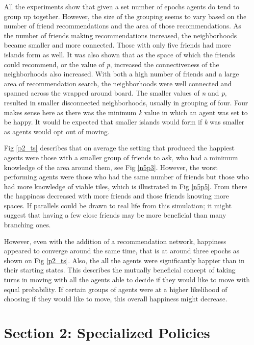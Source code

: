 \documentclass[11pt]{article}
\begin{document}
	All the experiments show that given a set number of epochs agents do tend to group up together. However, the size of the grouping seems to vary based on the number of friend recommendations and the area of those recommendations. As the number of friends making recommendations increased, the neighborhoods became smaller and more connected. Those with only five friends had more islands form as well. It was also shown that as the space of which the friends could recommend, or the value of \textit{p}, increased the connectiveness of the neighborhoods also increased. With both a high number of friends and a large area of recommendation search, the neighborhoods were well connected and spanned across the wrapped around board. The smaller values of \textit{n} and \textit{p}, resulted in smaller disconnected neighborhoods, usually in grouping of four. Four makes sense here as there was the minimum \textit{k} value in which an agent was set to be happy. It would be expected that smaller islands would form if \textit{k} was smaller as agents would opt out of moving. \par
	Fig \ref{p2_ts} describes that on average the setting that produced the happiest agents were those with a smaller group of friends to ask, who had a minimum knowledge of the area around them, see Fig \ref{n5p3}. However, the worst performing agents were those who had the same number of friends but those who had more knowledge of viable tiles, which is illustrated in Fig \ref{n5p5}. From there the happiness decreased with more friends and those friends knowing more spaces. If parallels could be drawn to real life from this simulation; it might suggest that having a few close friends may be more beneficial than many branching ones. \par
	However, even with the addition of a recommendation network, happiness appeared to converge around the same time, that is at around three epochs as shown on Fig \ref{p2_ts}. Also, the all the agents were significantly happier than in their starting states. This describes the mutually beneficial concept of taking turns in moving with all the agents able to decide if they would like to move with equal probability. If certain groups of agents were at a higher likelihood of choosing if they would like to move, this overall happiness might decrease. 
	


	\newpage
	\section{Section 2: Specialized Policies}
\end{document}
